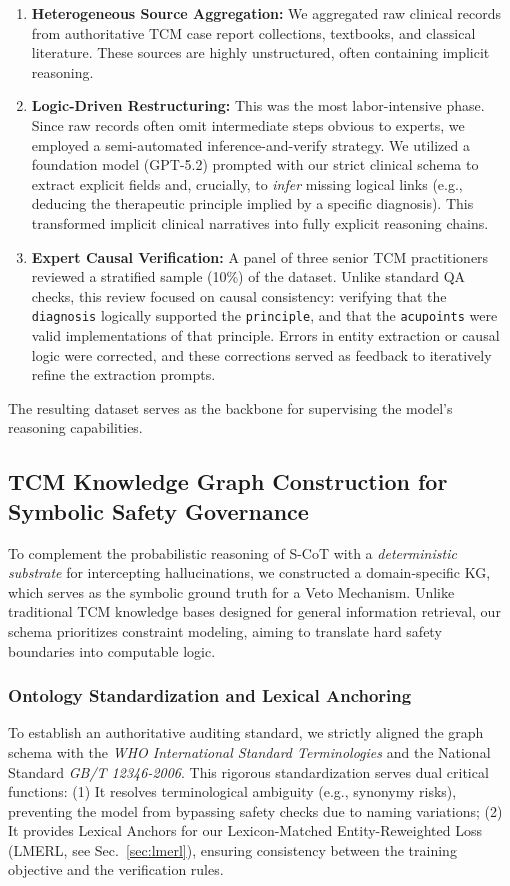\documentclass[preprint,5p,times,twocolumn,fleqn]{elsarticle}
\begin{document}
\begin{enumerate}
    \item \textbf{Heterogeneous Source Aggregation:} We aggregated raw clinical records from authoritative TCM case report collections, textbooks, and classical literature. These sources are highly unstructured, often containing implicit reasoning.
    \item \textbf{Logic-Driven Restructuring:} This was the most labor-intensive phase. Since raw records often omit intermediate steps obvious to experts, we employed a semi-automated inference-and-verify strategy. We utilized a foundation model (GPT-5.2) prompted with our strict clinical schema to extract explicit fields and, crucially, to \textit{infer} missing logical links (e.g., deducing the therapeutic principle implied by a specific diagnosis). This transformed implicit clinical narratives into fully explicit reasoning chains.
    \item \textbf{Expert Causal Verification:} A panel of three senior TCM practitioners reviewed a stratified sample (10\%) of the dataset. Unlike standard QA checks, this review focused on causal consistency: verifying that the \texttt{diagnosis} logically supported the \texttt{principle}, and that the \texttt{acupoints} were valid implementations of that principle. Errors in entity extraction or causal logic were corrected, and these corrections served as feedback to iteratively refine the extraction prompts.
\end{enumerate}

The resulting dataset serves as the backbone for supervising the model's reasoning capabilities.

\subsection{TCM Knowledge Graph Construction for Symbolic Safety Governance}
\label{sec:kg}

To complement the probabilistic reasoning of S-CoT with a \textit{deterministic substrate} for intercepting hallucinations, we constructed a domain-specific KG, which serves as the symbolic ground truth for a Veto Mechanism. Unlike traditional TCM knowledge bases designed for general information retrieval, our schema prioritizes constraint modeling, aiming to translate hard safety boundaries into computable logic.

\subsubsection{Ontology Standardization and Lexical Anchoring}
To establish an authoritative auditing standard, we strictly aligned the graph schema with the \textit{WHO International Standard Terminologies} and the National Standard \textit{GB/T 12346-2006}. This rigorous standardization serves dual critical functions: 
(1) It resolves terminological ambiguity (e.g., synonymy risks), preventing the model from bypassing safety checks due to naming variations; 
(2) It provides Lexical Anchors for our Lexicon-Matched Entity-Reweighted Loss (LMERL, see Sec.~\ref{sec:lmerl}), ensuring consistency between the training objective and the verification rules.
\end{document}
